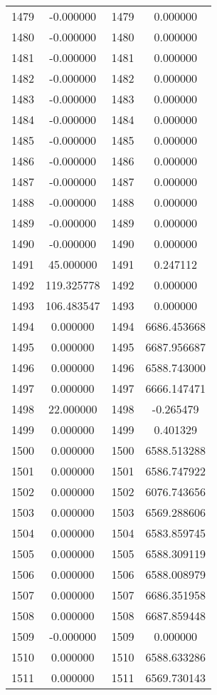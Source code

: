 \documentclass[12pt]{article}
\begin{document}
\begin{longtable}{@{}cccc@{}}
1479 & -0.000000 & 1479 & 0.000000 \\
1480 & -0.000000 & 1480 & 0.000000 \\
1481 & -0.000000 & 1481 & 0.000000 \\
1482 & -0.000000 & 1482 & 0.000000 \\
1483 & -0.000000 & 1483 & 0.000000 \\
1484 & -0.000000 & 1484 & 0.000000 \\
1485 & -0.000000 & 1485 & 0.000000 \\
1486 & -0.000000 & 1486 & 0.000000 \\
1487 & -0.000000 & 1487 & 0.000000 \\
1488 & -0.000000 & 1488 & 0.000000 \\
1489 & -0.000000 & 1489 & 0.000000 \\
1490 & -0.000000 & 1490 & 0.000000 \\
1491 & 45.000000 & 1491 & 0.247112 \\
1492 & 119.325778 & 1492 & 0.000000 \\
1493 & 106.483547 & 1493 & 0.000000 \\
1494 & 0.000000 & 1494 & 6686.453668 \\
1495 & 0.000000 & 1495 & 6687.956687 \\
1496 & 0.000000 & 1496 & 6588.743000 \\
1497 & 0.000000 & 1497 & 6666.147471 \\
1498 & 22.000000 & 1498 & -0.265479 \\
1499 & 0.000000 & 1499 & 0.401329 \\
1500 & 0.000000 & 1500 & 6588.513288 \\
1501 & 0.000000 & 1501 & 6586.747922 \\
1502 & 0.000000 & 1502 & 6076.743656 \\
1503 & 0.000000 & 1503 & 6569.288606 \\
1504 & 0.000000 & 1504 & 6583.859745 \\
1505 & 0.000000 & 1505 & 6588.309119 \\
1506 & 0.000000 & 1506 & 6588.008979 \\
1507 & 0.000000 & 1507 & 6686.351958 \\
1508 & 0.000000 & 1508 & 6687.859448 \\
1509 & -0.000000 & 1509 & 0.000000 \\
1510 & 0.000000 & 1510 & 6588.633286 \\
1511 & 0.000000 & 1511 & 6569.730143 \\

\end{longtable}
\end{document}
